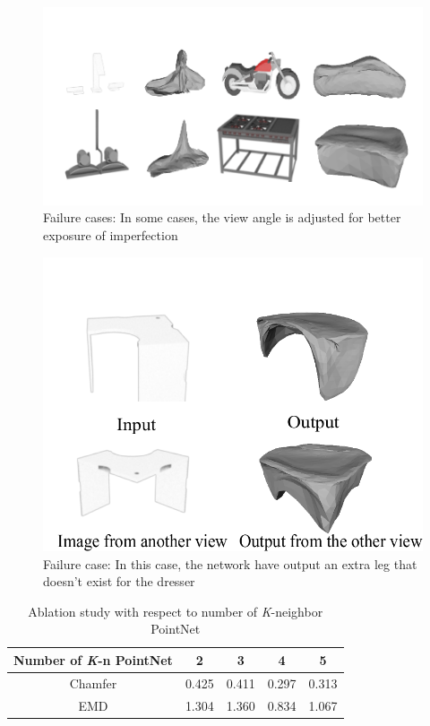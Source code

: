 


\begin{figure}[htbp]
	\centering
	\includegraphics[width=\linewidth]{img/fail/fail1}
	\caption{Failure cases: In some cases, the view angle is adjusted for better exposure of imperfection}
	\label{fig:fail1}
\end{figure}
\begin{figure}[htbp]
	\centering
	\includegraphics[width=\linewidth]{img/fail/fail2}
	\caption{Failure case: In this case, the network have output an extra leg that doesn't exist for the dresser}
	\label{fig:fail2}
\end{figure}
\begin{table}
	\caption{Ablation study with respect to number of \textit{K}-neighbor PointNet}
	\label{tab:pointnet}
	\centering
	\begin{tabular}{c | c c c c}
		Number of \textit{K}-n PointNet &  2 & 3 & 4 & 5 \\
		\hline
		Chamfer      & 0.425 &  0.411 & 0.297 & 0.313 \\
		EMD			 & 1.304 &  1.360 & 0.834 & 1.067
	\end{tabular}
\end{table}


